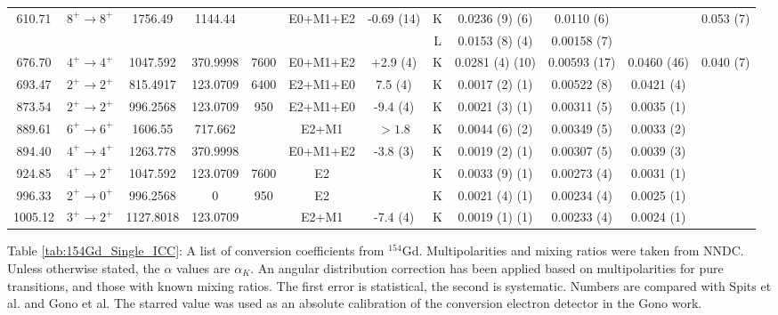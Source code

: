 \begin{sidewaystable}
\begin{longtable}{c|c|c|c|c|c|c|c|c|c|c|c}
        \hline
        610.71	&	$8^+	\rightarrow	8^+$	&	1756.49	&	1144.44	&		&	E0+M1+E2	&	-0.69 (14)	& K &	0.0236	(9) (6)	&	0.0110 (6)	& &	0.053 (7)	\\
	    &				&		&		&		&		&	& L	&	0.0153	(8) (4)	&	0.00158 (7)	&		\\
	    \hline
        676.70	&	$4^+	\rightarrow	4^+$	&	1047.592	&	370.9998	&	7600	&	E0+M1+E2	&	+2.9 (4)	& K &	0.0281	(4) (10)	&	0.00593 (17)	&	0.0460 (46) & 0.040 (7)	\\
        \hline
        693.47	&	$2^+	\rightarrow	2^+$	&	815.4917	&	123.0709	&	6400	&	E2+M1+E0	&	7.5 (4)	& K &	0.0017	(2) (1)	&	0.00522 (8)	&	0.0421 (4)	\\
        \hline
        873.54	&	$2^+	\rightarrow	2^+$	&	996.2568	&	123.0709	&	950	&	E2+M1+E0	&	-9.4 (4)	& K &	0.0021	(3)	(1) &	0.00311 (5)	&	0.0035 (1)	\\
        \hline
        889.61	&	$6^+	\rightarrow	6^+$	&	1606.55	&	717.662	&		&	E2+M1	&	$>1.8$	& K &	0.0044	(6) (2)	&	0.00349 (5)	&	0.0033 (2)	\\
        \hline
        894.40	&	$4^+	\rightarrow	4^+$	&	1263.778	&	370.9998	&		&	E0+M1+E2	&	-3.8 (3)	& K &	0.0019	(2) (1)	&	0.00307 (5)	&	0.0039 (3)	\\
        \hline
        924.85	&	$4^+	\rightarrow	2^+$	&	1047.592	&	123.0709	&	7600	&	E2	&	& K	&	0.0033	(9) (1)	&	0.00273 (4)	&	0.0031 (1)	\\
        \hline
        996.33	&	$2^+	\rightarrow	0^+$	&	996.2568	&	0	&	950	&	E2	&	& K	&	0.0021	(4) (1)	&	0.00234 (4)	&	0.0025 (1)	\\
        \hline
        1005.12	&	$3^+	\rightarrow	2^+$	&	1127.8018	&	123.0709	&		&	E2+M1	&	-7.4 (4) & K	&	0.0019	(1) (1)	&	0.00233 (4)	&	0.0024 (1)	\\
        \bottomrule
    \end{longtable}
    \item{Table \ref{tab:154Gd_Single_ICC}: A list of conversion coefficients from $^{154}$Gd. Multipolarities and mixing ratios were taken from NNDC. Unless otherwise stated, the $\alpha$ values are $\alpha_K$. An angular distribution correction has been applied based on multipolarities for pure transitions, and those with known mixing ratios. The first error is statistical, the second is systematic. Numbers are compared with Spits et al.\citep{spits96:_154gd} and Gono et al.\citep{gono74:_154gd_e0} The starred value was used as an absolute calibration of the conversion electron detector in the Gono work.}
\end{sidewaystable}